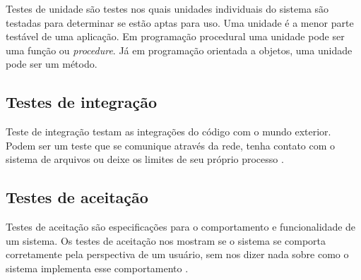 Testes de unidade são testes nos quais unidades individuais do sistema são testadas para determinar se estão aptas para uso. Uma unidade é a menor parte testável de uma aplicação. Em programação procedural uma unidade pode ser uma função ou \textit{procedure}. Já em programação orientada a objetos, uma unidade pode ser um método.


\subsection{Testes de integração}
\label{sub:testes_de_integracao}

Teste de integração testam as integrações do código com o mundo exterior. Podem ser um teste que se comunique através da rede, tenha contato com o sistema de arquivos ou deixe os limites de seu próprio processo \cite{ArtOfAgileDevelopment}.


\subsection{Testes de aceitação}
\label{sub:testes_de_aceitacao}

Testes de aceitação são especificações para o comportamento e funcionalidade de um sistema. Os testes de aceitação nos mostram se o sistema se comporta corretamente pela perspectiva de um usuário, sem nos dizer nada sobre como o sistema implementa esse comportamento \cite{TestDrivenKoskela}.


